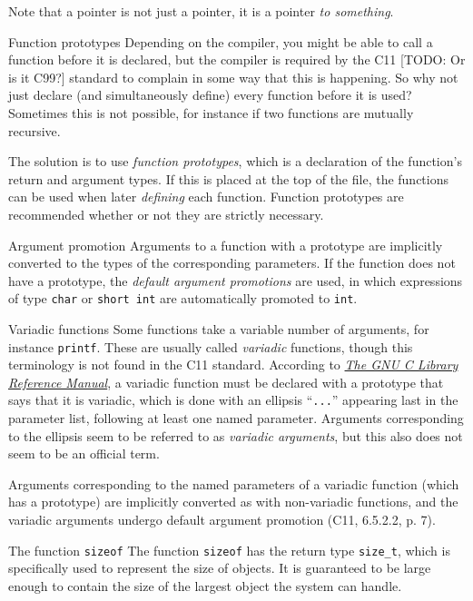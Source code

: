\documentclass[article, a4paper, 11pt, oneside]{memoir}
\numberwithin{equation}{chapter}
\newcommand{\inlinecode}[1]{\colorbox{lightgray}{\vphantom{\texttt{jk}}\lstinline$#1$}}
\renewcommand{\inlinecode}{\lstinline}
\begin{document}
\begin{notelist}
Note that a pointer is not just a pointer, it is a pointer \emph{to something}.

\item[Function prototypes]
Depending on the compiler, you might be able to call a function before it is declared, but the compiler is required by the C11 [TODO: Or is it C99?] standard to complain in some way that this is happening. So why not just declare (and simultaneously define) every function before it is used? Sometimes this is not possible, for instance if two functions are mutually recursive.

The solution is to use \emph{function prototypes}, which is a declaration of the function's return and argument types. If this is placed at the top of the file, the functions can be used when later \emph{defining} each function. Function prototypes are recommended whether or not they are strictly necessary.

\item[Argument promotion]
Arguments to a function with a prototype are implicitly converted to the types of the corresponding parameters. If the function does not have a prototype, the \emph{default argument promotions} are used, in which expressions of type \inlinecode{char} or \inlinecode{short int} are automatically promoted to \inlinecode{int}.

\item[Variadic functions]
Some functions take a variable number of arguments, for instance \inlinecode{printf}. These are usually called \emph{variadic} functions, though this terminology is not found in the C11 standard. According to \emph{\href{https://www.gnu.org/software/libc/manual/html_node/Variadic-Prototypes.html}{The GNU C Library Reference Manual}}, a variadic function must be declared with a prototype that says that it is variadic, which is done with an ellipsis \enquote{\inlinecode{...}} appearing last in the parameter list, following at least one named parameter. Arguments corresponding to the ellipsis seem to be referred to as \emph{variadic arguments}, but this also does not seem to be an official term.

Arguments corresponding to the named parameters of a variadic function (which has a prototype) are implicitly converted as with non-variadic functions, and the variadic arguments undergo default argument promotion (C11, 6.5.2.2, p. 7).

\item[The function \texttt{sizeof}]
The function \inlinecode{sizeof} has the return type \inlinecode{size_t}, which is specifically used to represent the size of objects. It is guaranteed to be large enough to contain the size of the largest object the system can handle.


\end{notelist}
\end{document}

